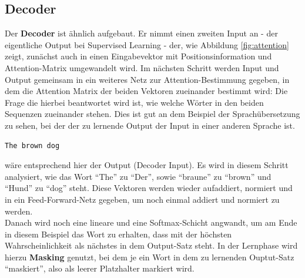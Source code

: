 \subsection*{Decoder}
Der \textbf{Decoder} ist \"ahnlich aufgebaut. Er nimmt einen zweiten Input an - der eigentliche Output bei Supervised Learning - der, wie Abbildung \ref{fig:attention} zeigt, zun\"achst auch in einen Eingabevektor mit Positionsinformation und Attention-Matrix umgewandelt wird. Im n\"achsten Schritt werden Input und Output gemeinsam in ein weiteres Netz zur Attention-Bestimmung gegeben, in dem die Attention Matrix der beiden Vektoren zueinander bestimmt wird: Die Frage die hierbei beantwortet wird ist, wie welche W\"orter in den beiden Sequenzen zueinander stehen. Dies ist gut an dem Beispiel der Sprach\"ubersetzung zu sehen, bei der der zu lernende Output der Input in einer anderen Sprache ist.
\begin{verbatim} 
The brown dog
\end{verbatim} 
w\"are entsprechend hier der Output (Decoder Input). Es wird in diesem Schritt analysiert, wie das Wort "`The"' zu "`Der"', sowie "`braune"' zu "`brown"' und "`Hund"' zu "`dog"' steht.
Diese Vektoren werden wieder aufaddiert, normiert und in ein Feed-Forward-Netz gegeben, um noch einmal addiert und normiert zu werden.\\
Danach wird noch eine lineare und eine Softmax-Schicht angwandt, um am Ende in diesem Beispiel das Wort zu erhalten, dass mit der h\"ochsten Wahrscheinlichkeit als n\"achstes in dem Output-Satz steht. In der Lernphase wird hierzu \textbf{Masking} genutzt, bei dem je ein Wort in dem zu lernenden Ouptut-Satz "`maskiert"', also als leerer Platzhalter markiert wird.

